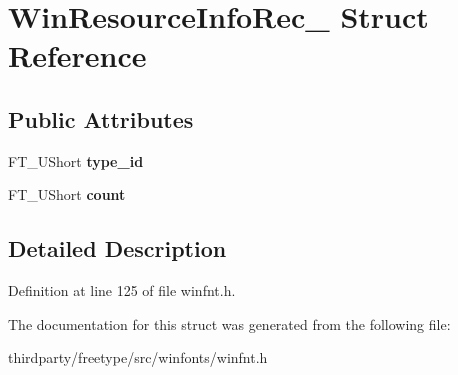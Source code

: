 \hypertarget{struct_win_resource_info_rec__}{}\section{Win\+Resource\+Info\+Rec\+\_\+ Struct Reference}
\label{struct_win_resource_info_rec__}
\subsection*{Public Attributes}
\begin{DoxyCompactItemize}
\item 
\mbox{\label{struct_win_resource_info_rec___ab9480c286489d77925ae0325b1ddf493}} 
F\+T\+\_\+\+U\+Short {\bfseries type\+\_\+id}
\item 
\mbox{\label{struct_win_resource_info_rec___a81078a1cf441d87132f175bcdd4de956}} 
F\+T\+\_\+\+U\+Short {\bfseries count}
\end{DoxyCompactItemize}


\subsection{Detailed Description}


Definition at line 125 of file winfnt.\+h.



The documentation for this struct was generated from the following file\+:\begin{DoxyCompactItemize}
\item 
thirdparty/freetype/src/winfonts/winfnt.\+h\end{DoxyCompactItemize}

